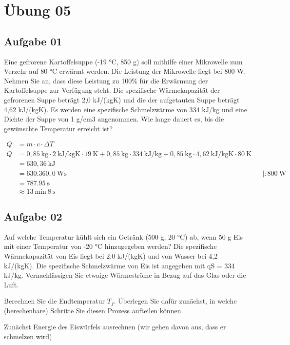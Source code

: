 \documentclass[a4paper,10pt]{article}
\begin{document}
\sidebar
{}
\par \vspace*{5mm}


\section{Übung 05}
\subsection{Aufgabe 01}
Eine gefrorene Kartoffelsuppe (-19 °C, 850 g) soll mithilfe einer Mikrowelle zum Verzehr auf
80 °C erwärmt werden. Die Leistung der Mikrowelle liegt bei 800 W. Nehmen Sie an, dass
diese Leistung zu 100\% für die Erwärmung der Kartoffelsuppe zur Verfügung steht.
Die spezifische Wärmekapazität der gefrorenen Suppe beträgt 2,0 kJ/(kgK) und die der
aufgetauten Suppe beträgt 4,62 kJ/(kgK). Es werden eine spezifische Schmelzwärme von 334
kJ/kg und eine Dichte der Suppe von 1 g/cm3 angenommen.
Wie lange dauert es, bis die gewünschte Temperatur erreicht ist?

\begin{align*}
Q &= m \cdot c \cdot \Delta T \\
Q &= 0,85~\text{kg} \cdot 2 ~\text{kJ/kgK} \cdot 19 ~\text{K} + 0,85~\text{kg} \cdot 334 ~\text{kJ/kg} + 0,85~\text{kg} \cdot 4,62 ~\text{kJ/kgK} \cdot 80 ~\text{K}\\
	&= 630,36 ~\text{kJ}  \\
	&= 630.360,0 ~\text{Ws } && | : 800 ~\text{W} \\
	&= 787.95~\text{s} \\
	&\approx 13~\text{min}~ 8~\text{s}
\end{align*}





\pagebreak
\subsection{Aufgabe 02}
Auf welche Temperatur kühlt sich ein Getränk (500 g, 20 °C) ab, wenn 50 g Eis mit einer
Temperatur von -20 °C hinzugegeben werden? Die spezifische Wärmekapazität von Eis liegt
bei 2,0 kJ/(kgK) und von Wasser bei 4,2 kJ/(kgK). Die spezifische Schmelzwärme von Eis ist
angegeben mit qS = 334 kJ/kg. Vernachlässigen Sie etwaige Wärmeströme in Bezug auf das
Glas oder die Luft. \par 
Berechnen Sie die Endtemperatur $T_f$. Überlegen Sie dafür zunächst, in welche (berechenbare)
Schritte Sie diesen Prozess aufteilen können. \par
\pp
Zunächst Energie des Eiswürfels ausrechnen (wir gehen davon aus, dass er schmelzen wird)
\end{document}
